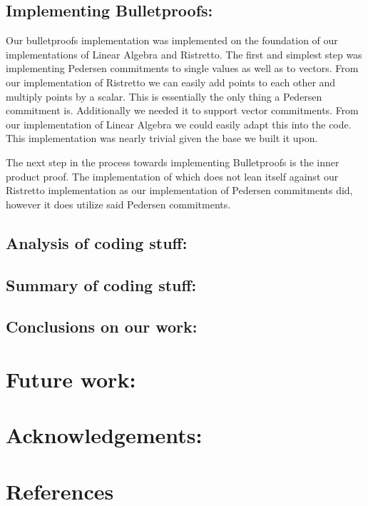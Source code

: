 \documentclass{article}
\begin{document}
\subsection{Implementing Bulletproofs:}

Our bulletproofs implementation was implemented on the foundation of our implementations of Linear Algebra and Ristretto. The first and simplest step was implementing Pedersen commitments to single values as well as to vectors. From our implementation of Ristretto we can easily add points to each other and multiply points by a scalar. This is essentially the only thing a Pedersen commitment is. Additionally we needed it to support vector commitments. From our implementation of Linear Algebra we could easily adapt this into the code. This implementation was nearly trivial given the base we built it upon.

The next step in the process towards implementing Bulletproofs is the inner product proof. The implementation of which does not lean itself against our Ristretto implementation as our implementation of Pedersen commitments did, however it does utilize said Pedersen commitments. 

\subsection{Analysis of coding stuff:}

\subsection{Summary of coding stuff:}

\subsection{Conclusions on our work:}

\section{Future work:}

\section{Acknowledgements:}


\section{References}
\printbibliography
\end{document}
